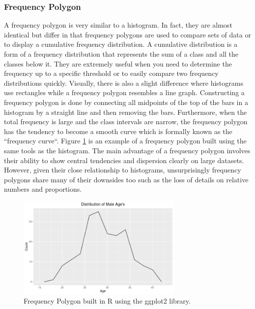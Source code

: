 \subsubsection{Frequency Polygon}
A frequency polygon is very similar to a histogram. In fact, they are almost 
identical but differ in that frequency polygons are used to compare sets of data or 
to display a cumulative frequency distribution. A cumulative distribution is a 
form of a frequency distribution that represents the sum of a class and all the
classes below it. They are extremely useful when you need to determine the frequency 
up to a specific threshold or to easily compare two frequency distributions quickly.
Visually, there is also a slight difference where histograms use rectangles 
while a frequency polygon resembles a line graph. Constructing a frequency polygon 
is done by connecting all midpoints of the top of the bars in a histogram by a 
straight line and then removing the bars. Furthermore, when the total frequency is large 
and the class intervals are narrow, the frequency polygon has the tendency to become 
a smooth curve which is formally known as the ``frequency curve``. Figure \ref{figure:freq_polygon}
is an example of a frequency polygon built using the same tools as the histogram. The 
main advantage of a frequency polygon involves their ability to show central 
tendencies and dispersion clearly on large datasets. However, given their close 
relationship to histograms, unsurprisingly frequency polygons share many of their 
downsides too such as the loss of details on relative numbers and proportions. 

\begin{figure}[!ht]
    \centering
        \includegraphics[height=5cm]{figures/freq_polygon.png}
    \caption{Frequency Polygon built in R using the ggplot2 library.}
    \label{figure:freq_polygon}
\end{figure}  

